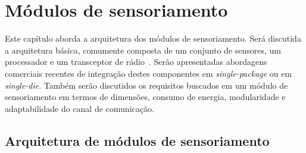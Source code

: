 \section{Módulos de sensoriamento}
\label{sec:modulos}

Este capítulo aborda a arquitetura dos módulos de sensoriamento. Será discutida
a arquitetura básica, comumente composta de um conjunto de sensores, um
processador e um transceptor de rádio~\cite{Barr:2002,Pottie:2000}. Serão
apresentadas abordagens comerciais recentes de integração destes componentes
em \emph{single-package} ou em \emph{single-die}. Também serão discutidos os
requisitos buscados em um módulo de sensoriamento em termos de dimensões,
consumo de energia, modularidade e adaptabilidade do canal de comunicação.

\subsection{Arquitetura de módulos de sensoriamento}

